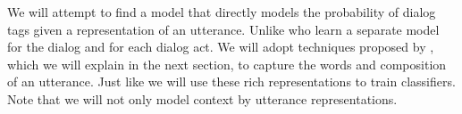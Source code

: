 
We will attempt to find a model that directly models the probability of dialog tags given a representation of an utterance. Unlike  who learn a separate model for the dialog and for each dialog act. We will adopt techniques proposed by , which we will explain in the next section, to capture the words and composition of an utterance. Just like  we will use these rich representations to train classifiers. Note that we will not only model context by  utterance representations.